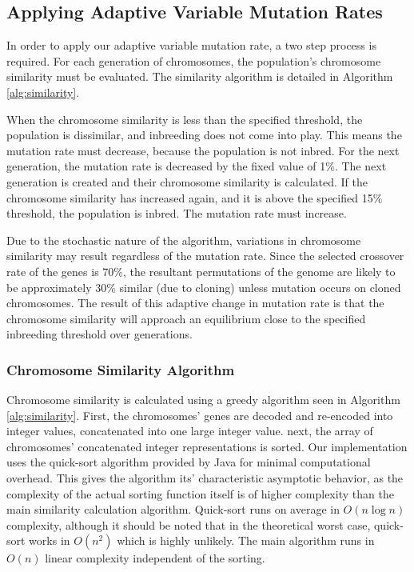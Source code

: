 \documentclass{sig-alternate}
\begin{document}
\subsection{Applying Adaptive Variable Mutation Rates}
In order to apply our adaptive variable mutation rate, a two step process is required. For each generation of chromosomes, the population's chromosome similarity must be evaluated. The similarity algorithm is detailed in Algorithm \ref{alg:similarity}.  

When the chromosome similarity is less than the specified threshold, the population is dissimilar, and inbreeding does not come into play. This means the mutation rate must decrease, because the population is not inbred. For the next generation, the mutation rate is decreased by the fixed value of 1\%. The next generation is created and their chromosome similarity is calculated. If the chromosome similarity has increased again, and it is above the specified 15\% threshold, the population is inbred. The mutation rate must increase. 

Due to the stochastic nature of the algorithm, variations in chromosome similarity may result regardless of the mutation rate. Since the selected crossover rate of the genes is 70\%, the resultant permutations of the genome are likely to be approximately 30\% similar (due to cloning) unless mutation occurs on cloned chromosomes. The result of this adaptive change in mutation rate is that the chromosome similarity will approach an equilibrium close to the specified inbreeding threshold over generations.

\subsubsection{Chromosome Similarity Algorithm}
Chromosome similarity is calculated using a greedy algorithm seen in Algorithm \ref{alg:similarity}. First, the chromosomes' genes are decoded and re-encoded into integer values, concatenated into one large integer value. next, the array of chromosomes' concatenated integer representations is sorted. Our implementation uses the quick-sort algorithm provided by Java for minimal computational overhead. This gives the algorithm its' characteristic asymptotic behavior, as the complexity of the actual sorting function itself is of higher complexity than the main similarity calculation algorithm. Quick-sort runs on average in $O(n \log n)$ complexity, although it should be noted that in the theoretical worst case, quick-sort works in $O(n^2)$ which is highly unlikely. The main algorithm runs in $O(n)$ linear complexity independent of the sorting.
\end{document}
